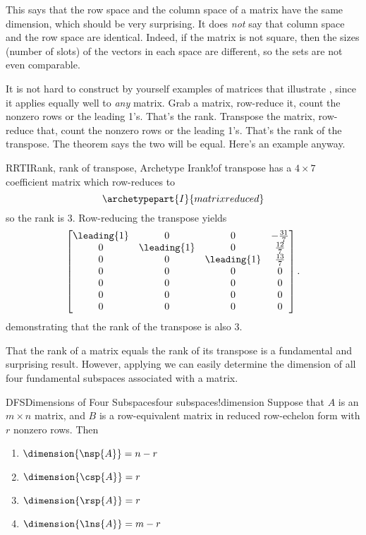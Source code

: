 %
This says that the row space and the column space of a matrix have the same dimension, which should be very surprising.  It does {\em not} say that column space and the row space are identical.  Indeed, if the matrix is not square, then the sizes (number of slots) of the vectors in each space are different, so the sets are not even comparable.\par
%
It is not hard to construct by yourself examples of matrices that illustrate , since it applies equally well to {\em any} matrix.  Grab a matrix, row-reduce it, count the nonzero rows or the leading 1's.  That's the rank.  Transpose the matrix, row-reduce that, count the nonzero rows or the leading 1's.  That's the rank of the transpose.  The theorem says the two will be equal.  Here's an example anyway.
%
\begin{example}{RRTI}{Rank, rank of transpose, Archetype I}{rank!of transpose}
 has a $4\times 7$ coefficient matrix which row-reduces to
%
\begin{equation*}
\archetypepart{I}{matrixreduced}
\end{equation*}
%
so the rank is $3$.  Row-reducing the transpose yields
%
\begin{equation*}
\begin{bmatrix}
\leading{1} & 0 & 0 & -\frac{31}{7}\\
0 & \leading{1} & 0 & \frac{12}{7}\\
0 & 0 & \leading{1} & \frac{13}{7}\\
0 & 0 & 0 & 0\\
0 & 0 & 0 & 0\\
0 & 0 & 0 & 0\\
0 & 0 & 0 & 0
\end{bmatrix}.
\end{equation*}
%
demonstrating that the rank of the transpose is also $3$.
%
\end{example}
%
%
That the rank of a matrix equals the rank of its transpose is a fundamental and surprising result.  However, applying  we can easily determine the dimension of all four fundamental subspaces associated with a matrix.
%
\begin{theorem}{DFS}{Dimensions of Four Subspaces}{four subspaces!dimension}
Suppose that $A$ is an $m\times n$ matrix, and $B$ is a row-equivalent matrix in reduced row-echelon form with $r$ nonzero rows.  Then
\begin{enumerate}
\item $\dimension{\nsp{A}}=n-r$
\item $\dimension{\csp{A}}=r$
\item $\dimension{\rsp{A}}=r$
\item $\dimension{\lns{A}}=m-r$
\end{enumerate}
\end{theorem}
